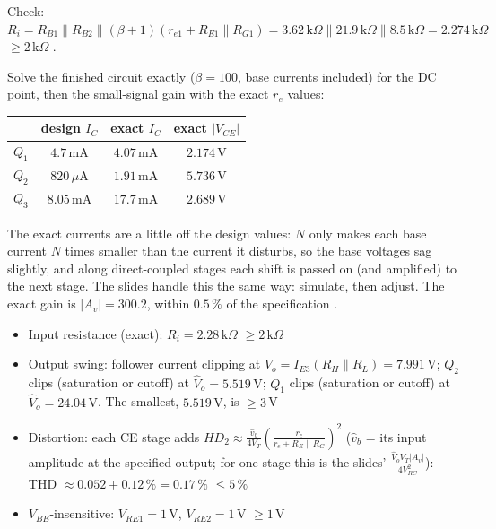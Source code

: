 \documentclass[11pt]{article}
\newcommand{\solstep}[2]{\par\medskip{\color{stepc}\textbf{Step #1 --- #2}}\par\nopagebreak}
\begin{document}
Check: $R_i = R_{B1}\|R_{B2}\|(\beta+1)(r_{e1} + R_{E1}\|R_{G1}) = 3.62\,\mathrm{k}\Omega\|21.9\,\mathrm{k}\Omega\|8.5\,\mathrm{k}\Omega = 2.274\,\mathrm{k}\Omega$ $\ge 2\,\mathrm{k}\Omega$ \checkmark.
\solstep{5}{Check by analysis}Solve the finished circuit exactly ($\beta=100$, base currents included) for the DC point, then the small-signal gain with the exact $r_e$ values:\begin{center}\renewcommand{\arraystretch}{1.35}
\begin{tabular}{cccc}
\toprule
 & design $I_C$ & exact $I_C$ & exact $|V_{CE}|$ \\
\midrule
$Q_{1}$ & $4.7\,\mathrm{m}\mathrm{A}$ & $4.07\,\mathrm{m}\mathrm{A}$ & $2.174\,\mathrm{V}$ \\
$Q_{2}$ & $820\,\mu \mathrm{A}$ & $1.91\,\mathrm{m}\mathrm{A}$ & $5.736\,\mathrm{V}$ \\
$Q_{3}$ & $8.05\,\mathrm{m}\mathrm{A}$ & $17.7\,\mathrm{m}\mathrm{A}$ & $2.689\,\mathrm{V}$ \\
\bottomrule
\end{tabular}\end{center}
The exact currents are a little off the design values: $N$ only makes each base current $N$ times smaller than the current it disturbs, so the base voltages sag slightly, and along direct-coupled stages each shift is passed on (and amplified) to the next stage. The slides handle this the same way: simulate, then adjust. The exact gain is $|A_v| = 300.2$, within $0.5\,\%$ of the specification \checkmark. \begin{itemize}[leftmargin=*,itemsep=2pt]
\item Input resistance (exact): $R_i = 2.28\,\mathrm{k}\Omega$ $\ge 2\,\mathrm{k}\Omega$ \checkmark
\item Output swing: follower current clipping at $\hat V_o = I_{E3}(R_H\|R_L) = 7.991\,\mathrm{V}$; $Q_{2}$ clips (saturation or cutoff) at $\hat V_o = 5.519\,\mathrm{V}$; $Q_{1}$ clips (saturation or cutoff) at $\hat V_o = 24.04\,\mathrm{V}$. The smallest, $5.519\,\mathrm{V}$, is $\ge 3$\,V \checkmark
\item Distortion: each CE stage adds $HD_2 \approx \frac{\hat v_b}{4V_T}\left(\frac{r_e}{r_e + R_E\|R_G}\right)^2$ ($\hat v_b$ = its input amplitude at the specified output; for one stage this is the slides' $\frac{\hat V_o V_T |A_v|}{4V_{RC}^2}$): THD $\approx 0.052 + 0.12\,\% = 0.17\,\%$ $\le 5\,\%$ \checkmark
\item $V_{BE}$-insensitive: $V_{RE1} = 1$\,V, $V_{RE2} = 1$\,V $\ge 1$\,V \checkmark
\end{itemize}
\end{document}

